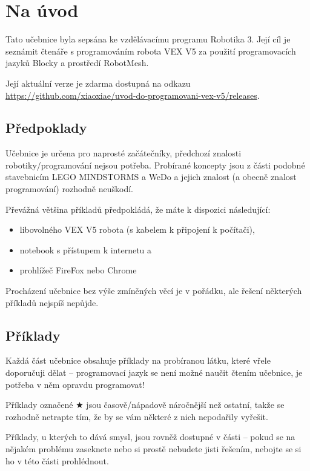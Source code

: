 \tableofcontents
\clearpage

\setcounter{secnumdepth}{0}
\section{Na úvod}
Tato učebnice byla sepsána ke vzdělávacímu programu Robotika 3. Její cíl je seznámit čtenáře s programováním robota VEX V5 za použití programovacích jazyků Blocky a prostředí RobotMesh.

Její aktuální verze je zdarma dostupná na odkazu \href{https://github.com/xiaoxiae/uvod-do-programovani-vex-v5/releases}{https://github.com/xiaoxiae/uvod-do-programovani-vex-v5/releases}.

\subsection{Předpoklady}
Učebnice je určena pro naprosté začátečníky, předchozí znalosti robotiky/programování nejsou potřeba. Probírané koncepty jsou z části podobné stavebnicím LEGO MINDSTORMS a WeDo a jejich znalost (a obecně znalost programování) rozhodně neuškodí.

Převážná většina příkladů předpokládá, že máte k dispozici následující:
\begin{itemize}
	\item libovolného VEX V5 robota (s kabelem k připojení k počítači),
	\item notebook s přístupem k internetu a
	\item prohlížeč FireFox nebo Chrome
\end{itemize}

Procházení učebnice bez výše zmíněných věcí je v pořádku, ale řešení některých příkladů nejspíš nepůjde.

\subsection{Příklady}
Každá část učebnice obsahuje příklady na probíranou látku, které vřele doporučuji dělat -- programovací jazyk se není možné naučit čtením učebnice, je potřeba v něm opravdu programovat!

Příklady označené $\bigstar$ jsou časově/nápadově náročnější než ostatní, takže se rozhodně netrapte tím, že by se vám některé z nich nepodařily vyřešit.

Příklady, u kterých to dává smysl, jsou rovněž dostupné v části  -- pokud se na nějakém problému zaseknete nebo si prostě nebudete jisti řešením, nebojte se si ho v této části prohlédnout.

